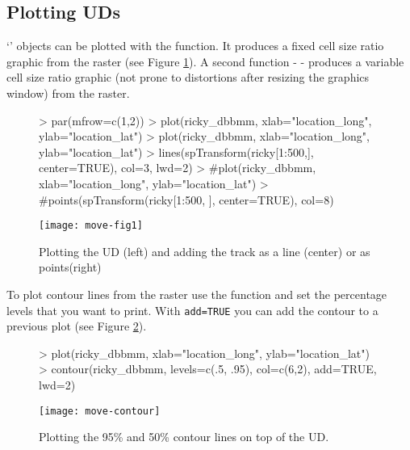 \documentclass[article,nojss]{jss}
\newcommand{\fct}[1]{{\code{#1()}}}
\newcommand{\class}[1]{{`\code{#1}'}}
\begin{document}
\subsection{Plotting UDs}
\class{DBBMM} objects can be plotted with the \fct{plot} function. It produces a fixed cell size ratio graphic from the raster (see Figure \ref{fig:two}). A second function - \fct{image} - produces a variable cell size ratio graphic (not prone to distortions after resizing the graphics window) from the raster. \\



\begin{figure}
\begin{center}
\begin{Schunk}
\begin{Sinput}
> par(mfrow=c(1,2))
> plot(ricky_dbbmm, xlab="location_long", ylab="location_lat")
> plot(ricky_dbbmm, xlab="location_long", ylab="location_lat")
> lines(spTransform(ricky[1:500,], center=TRUE), col=3, lwd=2)
> #plot(ricky_dbbmm, xlab="location_long", ylab="location_lat")
> #points(spTransform(ricky[1:500, ], center=TRUE), col=8)
\end{Sinput}
\end{Schunk}
\texttt{[image: move-fig1]}
\end{center}
\caption{Plotting the UD (left) and adding the track as a line (center) or as points(right)}
\label{fig:two}
\end{figure}

To plot contour lines from the raster use the \fct{contour} function and set the percentage levels that you want to print. With \texttt{add=TRUE} you can add the contour to a previous plot (see Figure \ref{fig:three}). \\

\begin{figure}
\begin{center}
\begin{Schunk}
\begin{Sinput}
> plot(ricky_dbbmm, xlab="location_long", ylab="location_lat")
> contour(ricky_dbbmm, levels=c(.5, .95), col=c(6,2), add=TRUE, lwd=2)
\end{Sinput}
\end{Schunk}
\texttt{[image: move-contour]}
\end{center}
\caption{Plotting the 95\% and 50\% contour lines on top of the UD.}
\label{fig:three}
\end{figure}
\end{document}
